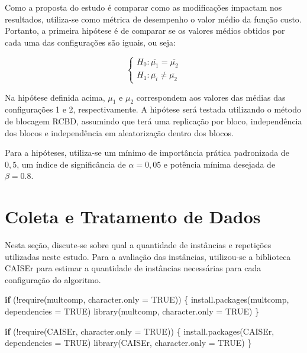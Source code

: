 \documentclass[
]{article}
\newenvironment{Shaded}{\begin{snugshade}}{\end{snugshade}}
\newcommand{\AttributeTok}[1]{\textcolor[rgb]{0.77,0.63,0.00}{#1}}
\newcommand{\ConstantTok}[1]{\textcolor[rgb]{0.00,0.00,0.00}{#1}}
\newcommand{\ControlFlowTok}[1]{\textcolor[rgb]{0.13,0.29,0.53}{\textbf{#1}}}
\newcommand{\FunctionTok}[1]{\textcolor[rgb]{0.00,0.00,0.00}{#1}}
\newcommand{\NormalTok}[1]{#1}
\newcommand{\SpecialCharTok}[1]{\textcolor[rgb]{0.00,0.00,0.00}{#1}}
\newcommand{\StringTok}[1]{\textcolor[rgb]{0.31,0.60,0.02}{#1}}
\begin{document}
Como a proposta do estudo é comparar como as modificações impactam nos
resultados, utiliza-se como métrica de desempenho o valor médio da
função custo. Portanto, a primeira hipótese é de comparar se os valores
médios obtidos por cada uma das configurações são iguais, ou seja:

\[
\begin{cases} H_0: \overline{\mu_1} = \overline{\mu_2}\\H_1: \overline{\mu_i} \neq \overline{\mu_2}\end{cases}
\]

Na hipótese definida acima, \(\mu_1\) e \(\mu_2\) correspondem aos
valores das médias das configurações 1 e 2, respectivamente. A hipótese
será testada utilizando o método de blocagem RCBD, assumindo que terá
uma replicação por bloco, independência dos blocos e independência em
aleatorização dentro dos blocos.

Para a hipóteses, utiliza-se um mínimo de importância prática
padronizada de \(0,5\), um índice de significância de \(\alpha = 0,05\)
e potência mínima desejada de \(\beta = 0.8\).

\hypertarget{coleta-e-tratamento-de-dados}{%
\section{Coleta e Tratamento de
Dados}\label{coleta-e-tratamento-de-dados}}

Nesta seção, discute-se sobre qual a quantidade de instâncias e
repetições utilizadas neste estudo. Para a avaliação das instâncias,
utilizou-se a biblioteca CAISEr para estimar a quantidade de instâncias
necessárias para cada configuração do algoritmo.

\begin{Shaded}
\begin{Highlighting}[]
\ControlFlowTok{if}\NormalTok{ (}\SpecialCharTok{!}\FunctionTok{require}\NormalTok{(}\StringTok{\textquotesingle{}multcomp\textquotesingle{}}\NormalTok{, }\AttributeTok{character.only =} \ConstantTok{TRUE}\NormalTok{)) \{}
      \FunctionTok{install.packages}\NormalTok{(}\StringTok{\textquotesingle{}multcomp\textquotesingle{}}\NormalTok{, }\AttributeTok{dependencies =} \ConstantTok{TRUE}\NormalTok{)}
      \FunctionTok{library}\NormalTok{(}\StringTok{\textquotesingle{}multcomp\textquotesingle{}}\NormalTok{, }\AttributeTok{character.only =} \ConstantTok{TRUE}\NormalTok{)}
\NormalTok{\}}

\ControlFlowTok{if}\NormalTok{ (}\SpecialCharTok{!}\FunctionTok{require}\NormalTok{(}\StringTok{\textquotesingle{}CAISEr\textquotesingle{}}\NormalTok{, }\AttributeTok{character.only =} \ConstantTok{TRUE}\NormalTok{)) \{}
      \FunctionTok{install.packages}\NormalTok{(}\StringTok{\textquotesingle{}CAISEr\textquotesingle{}}\NormalTok{, }\AttributeTok{dependencies =} \ConstantTok{TRUE}\NormalTok{)}
      \FunctionTok{library}\NormalTok{(}\StringTok{\textquotesingle{}CAISEr\textquotesingle{}}\NormalTok{, }\AttributeTok{character.only =} \ConstantTok{TRUE}\NormalTok{)}
\NormalTok{\}}
\end{Highlighting}
\end{Shaded}
\end{document}
